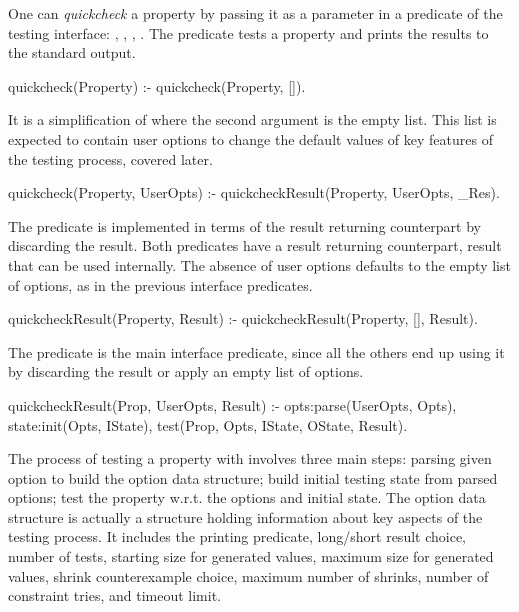 One can \emph{quickcheck} a property by passing it as a parameter in a
predicate of the \plqc{} testing interface: ,
, , .
%
The predicate  tests a property and prints the results
to the standard output.
%
\begin{yapcode}
 quickcheck(Property) :-
   quickcheck(Property, []).
\end{yapcode}
%
It is a simplification of  where the second argument
is the empty list.
%
This list is expected to contain user options to change the default
values of key features of the testing process, covered later.
\begin{yapcode}
 quickcheck(Property, UserOpts)  :-
   quickcheckResult(Property, UserOpts, _Res).
\end{yapcode}
%
The predicate is implemented in terms of the result returning
counterpart by discarding the result.
%
Both  predicates have a result returning counterpart,
result that can be used internally.
%
The absence of user options defaults to the empty list of options, as in
the previous interface predicates.
\begin{yapcode}
 quickcheckResult(Property, Result) :-
   quickcheckResult(Property, [], Result).
\end{yapcode}
The predicate  is the main interface predicate,
since all the others end up using it by discarding the result or apply
an empty list of options.
\begin{yapcode}
 quickcheckResult(Prop, UserOpts, Result) :-
   opts:parse(UserOpts, Opts),
   state:init(Opts, IState),
   test(Prop, Opts, IState, OState, Result).
\end{yapcode}


The process of testing a property with 
involves three main steps: parsing given option to build the option data
structure; build initial testing state from parsed options; test the
property w.r.t. the  options and initial state.
%
The option data structure is actually a structure holding information
about key aspects of the testing process.
%
It includes the printing predicate, long/short result choice, number of
tests, starting size for generated values, maximum size for generated
values, shrink counterexample choice, maximum number of shrinks, number
of constraint tries, and timeout limit.


